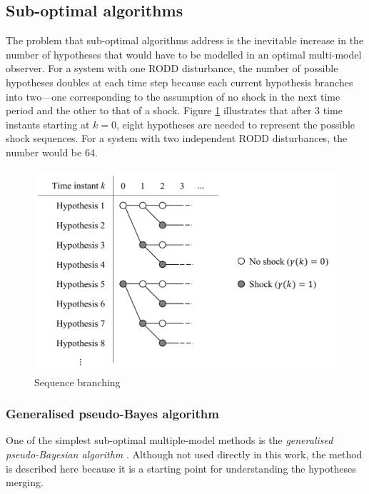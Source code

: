 \subsection{Sub-optimal algorithms}

The problem that sub-optimal algorithms address is the inevitable increase in the number of hypotheses that would have to be modelled in an optimal multi-model observer. For a system with one RODD disturbance, the number of possible hypotheses doubles at each time step because each current hypothesis branches into two—one corresponding to the assumption of no shock in the next time period and the other to that of a shock. Figure \ref{fig:mm-obs-br} illustrates that after 3 time instants starting at $k=0$, eight hypotheses are needed to represent the possible shock sequences. For a system with two independent RODD disturbances, the number would be 64.

\begin{figure}[htp]
	\centering
	\includegraphics[height=7.5cm]{images/mm_obs_seq_br.pdf}
	\caption{Sequence branching}
	\label{fig:mm-obs-br}
\end{figure}

\subsubsection{Generalised pseudo-Bayes algorithm} \label{subsec-GPB}

One of the simplest sub-optimal multiple-model methods is the \textit{generalised pseudo-Bayesian algorithm} \citep{buxbaum_recursive_1969, jaffer_estimation_1971, tugnait_detection_1982}. Although not used directly in this work, the method is described here because it is a starting point for understanding the hypotheses merging.

